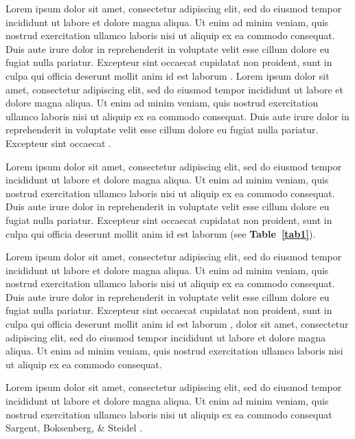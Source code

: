 \documentclass{sbc2025}%
\begin{document}
Lorem ipsum dolor sit amet, consectetur adipiscing elit, sed do eiusmod tempor incididunt ut labore et dolore magna aliqua. Ut enim ad minim veniam, quis nostrud exercitation ullamco laboris nisi ut aliquip ex ea commodo consequat. Duis aute irure dolor in reprehenderit in voluptate velit esse cillum dolore eu fugiat nulla pariatur. Excepteur sint occaecat cupidatat non proident, sunt in culpa qui officia deserunt mollit anim id est laborum \cite{abt1961}. 
Lorem ipsum dolor sit amet, consectetur adipiscing elit, sed do eiusmod tempor incididunt ut labore et dolore magna aliqua. Ut enim ad minim veniam, quis nostrud exercitation ullamco laboris nisi ut aliquip ex ea commodo consequat. Duis aute irure dolor in reprehenderit in voluptate velit esse cillum dolore eu fugiat nulla pariatur. Excepteur sint occaecat \cite{abt1961}.

Lorem ipsum dolor sit amet, consectetur adipiscing elit, sed do eiusmod tempor incididunt ut labore et dolore magna aliqua. Ut enim ad minim veniam, quis nostrud exercitation ullamco laboris nisi ut aliquip ex ea commodo consequat. Duis aute irure dolor in reprehenderit in voluptate velit esse cillum dolore eu fugiat nulla pariatur. Excepteur sint occaecat cupidatat non proident, sunt in culpa qui officia deserunt mollit anim id est laborum (see \textbf{ Table~\ref{tab1}}).

Lorem ipsum dolor sit amet, consectetur adipiscing elit, sed do eiusmod tempor incididunt ut labore et dolore magna aliqua. Ut enim ad minim veniam, quis nostrud exercitation ullamco laboris nisi ut aliquip ex ea commodo consequat. Duis aute irure dolor in reprehenderit in voluptate velit esse cillum dolore eu fugiat nulla pariatur. Excepteur sint occaecat cupidatat non proident, sunt in culpa qui officia deserunt mollit anim id est laborum \citet{lwt}, dolor sit amet, consectetur adipiscing elit, sed do eiusmod tempor incididunt ut labore et dolore magna aliqua. Ut enim ad minim veniam, quis nostrud exercitation ullamco laboris nisi ut aliquip ex ea commodo consequat.

Lorem ipsum dolor sit amet, consectetur adipiscing elit, 
sed do eiusmod tempor incididunt ut labore et dolore magna aliqua. 
Ut enim ad minim veniam, quis nostrud exercitation ullamco laboris nisi ut aliquip ex ea commodo consequat Sargent, Boksenberg, \& Steidel \citet{sbs}.
\end{document}
